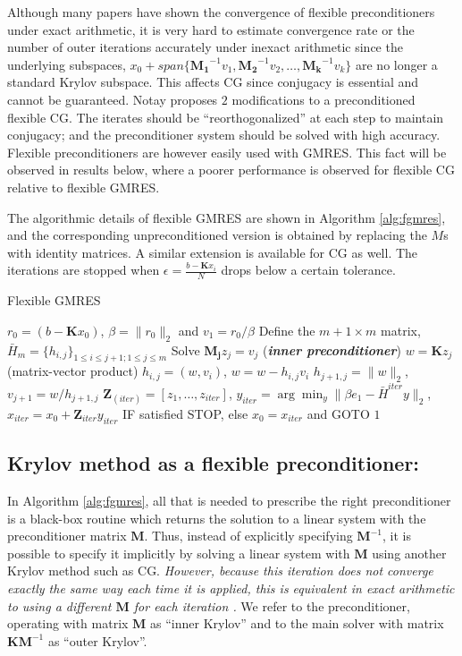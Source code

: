 \documentclass[10pt,journal,letterpaper,compsoc]{IEEEtran}
\begin{document}
Although many papers have shown the convergence of flexible preconditioners under exact arithmetic, it is very hard to estimate convergence rate or the number of outer iterations accurately under inexact arithmetic since the underlying subspaces, $x_0+span\{\mathbf{M_1}^{-1}v_1,\mathbf{M_2}^{-1}v_2, \ldots, \mathbf{M_k}^{-1}v_k\}$ are no longer a standard Krylov subspace. This affects CG since conjugacy is essential and cannot be guaranteed. Notay \cite{FlexibleCG} proposes $2$ modifications to a preconditioned flexible CG. The iterates should be ``reorthogonalized'' at each step to maintain conjugacy; and the preconditioner system should be solved with high accuracy. Flexible preconditioners are however easily used with GMRES. This fact will be observed in results below, where a poorer performance is observed for flexible CG relative to flexible GMRES.

The algorithmic details of flexible GMRES are shown in Algorithm \ref{alg:fgmres}, and the corresponding unpreconditioned version is obtained by replacing the $M$s with identity matrices. A similar extension is available for CG as well. The iterations are stopped when $\epsilon=\frac{b-\mathbf{K}x_i}{N}$ drops below a certain tolerance.

\begin{algorithm}[bth]
\caption{Flexible GMRES \cite{FGMRES}} \label{alg:fgmres}
\begin{algorithmic}[1]
\STATE $r_0=\left(b-\mathbf{K}x_0\right)$, $\beta=\|r_0\|_2$ and $v_1=r_0/\beta$
\STATE Define the $m+1 \times m$ matrix, $\bar{H}_m=\{h_{i,j}\}_{1\leq i\leq j+1;1\leq j\leq m}$
    \STATE Solve $\mathbf{M_j}z_j=v_j$ (\emph{\textbf{inner preconditioner}})
    \STATE $w=\mathbf{K}z_j$ (matrix-vector product)
        \STATE $h_{i,j} = (w,v_i)$, $w = w - h_{i,j}v_i$
    \ENDFOR
    \STATE $h_{j+1,j}=\|w\|_2$, $v_{j+1}=w/h_{j+1,j}$
\ENDFOR
\STATE $\mathbf{Z}_{(iter)}=\left[z_1,\ldots,z_{iter}\right]$,
\STATE $y_{iter}=\arg\min_y \|\beta e_1 - \bar{H}^{iter}y\|_2 $, $x_{iter} = x_0 + \mathbf{Z}_{iter}y_{iter}$
\STATE IF satisfied STOP, else $x_0=x_{iter}$ and GOTO $1$
\end{algorithmic}
\end{algorithm}

\subsection{Krylov method as a flexible preconditioner:} In Algorithm \ref{alg:fgmres}, all that is needed to prescribe the right preconditioner is a black-box routine which returns the solution to a linear system with the preconditioner matrix $\mathbf{M}$. Thus, instead of explicitly specifying $\mathbf{M}^{-1}$, it is possible to specify it implicitly by solving a linear system with $\mathbf{M}$ using another Krylov method such as CG. \emph{However, because this iteration does not converge exactly the same way each time it is applied, this is equivalent in exact arithmetic to using a different $\mathbf{M}$ for each iteration \cite{FlexibleKrylov}.} We refer to the preconditioner, operating with matrix $\mathbf{M}$ as ``inner Krylov'' and to the main solver with matrix $\mathbf{KM}^{-1}$ as ``outer Krylov''.
\end{document}
